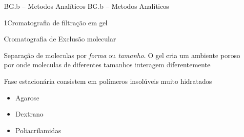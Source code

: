 \documentclass[\mainfilename]{subfiles}
\begin{document}
{BG.b -- Metodos Analíticos}
{BG.b -- Metodos Analíticos}

\begin{sectionBox}1{Cromatografia de filtração em gel}
    
    Cromatografia de Exclusão molecular

    Separação de moleculas por \emph{forma} ou \emph{tamanho}. O gel cria um ambiente poroso por onde moleculas de diferentes tamanhos interagem diferentemente

    Fase estacionária consistem em polímeros insolúveis muito hidratados
    \begin{itemize}
        \item Agarose
        \item Dextrano
        \item Poliacrilamidas
    \end{itemize}
    
\end{sectionBox}
\end{document}
